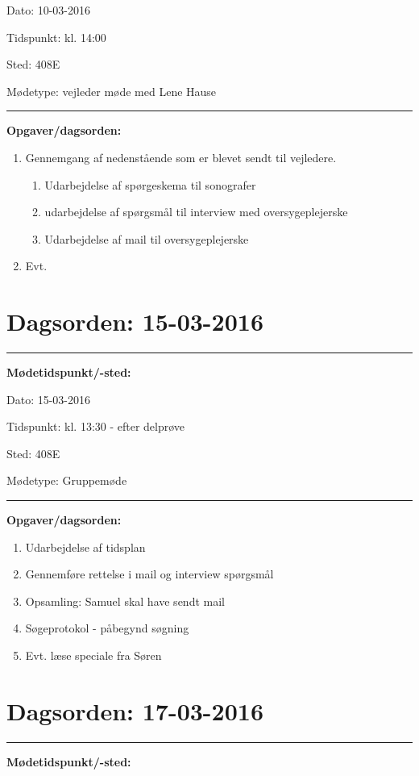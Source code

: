 Dato: \tabto{7em} 10-03-2016

Tidspunkt: \tabto{7em} kl. 14:00

Sted: \tabto{7em} 408E

Mødetype: \tabto{7em} vejleder møde med Lene Hause \newline


\hrule
\textbf{Opgaver/dagsorden:} \newline
\begin{enumerate}
	\item Gennemgang af nedenstående som er blevet sendt til vejledere.
	\begin{enumerate}
		\item Udarbejdelse af spørgeskema til sonografer
		\item udarbejdelse af spørgsmål til  interview med oversygeplejerske
		\item Udarbejdelse af mail  til oversygeplejerske 
	\end{enumerate} 
	\item Evt. 
\end{enumerate}


\section{Dagsorden: 15-03-2016 }
\hrule
\textbf{Mødetidspunkt/-sted:} 

Dato: \tabto{7em} 15-03-2016

Tidspunkt: \tabto{7em} kl. 13:30 - efter delprøve

Sted: \tabto{7em} 408E

Mødetype: \tabto{7em} Gruppemøde \newline


\hrule
\textbf{Opgaver/dagsorden:} \newline
\begin{enumerate}
	\item Udarbejdelse af tidsplan 
	\item Gennemføre rettelse i mail og interview spørgsmål
	\item Opsamling:  Samuel skal have sendt mail
	\item Søgeprotokol - påbegynd søgning  
	\item Evt. læse speciale fra Søren
\end{enumerate}

\newpage
\section{Dagsorden: 17-03-2016 }
\hrule
\textbf{Mødetidspunkt/-sted:} 

